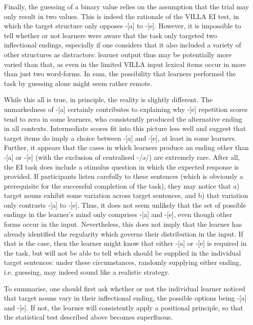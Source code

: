 Finally, the guessing of a binary value relies on the assumption that the trial may only result in two values. This is indeed the rationale of the VILLA EI test, in which the target structure only opposes -[a] to -[e]. However, it is impossible to tell whether or not learners were aware that the task only targeted two inflectional endings, especially if one considers that it also included a variety of other structures as distractors: learner output thus may be potentially more varied than that, as even in the limited VILLA input lexical items occur in more than just two word-forms. In sum, the possibility that learners performed the task by guessing alone might seem rather remote.

While this all is true, in principle, the reality is slightly different. The unmarkedness of -[a] certainly contributes to explaining why -[e] repetition scores tend to zero in some learners, who consistently produced the alternative ending in all contexts. Intermediate scores fit into this picture less well and suggest that target items do imply a choice between -[a] and -[e], at least in some learners. Further, it appears that the cases in which learners produce an ending other than -[a] or -[e] (with the exclusion of centralised -/ə/) are extremely rare. After all, the EI task does include a stimulus question in which the expected response is provided. If participants listen carefully to these sentences (which is obviously a prerequisite for the successful completion of the task), they may notice that a) target nouns exhibit some variation across target sentences, and b) that variation only contrasts -[a] to -[e]. Thus, it does not seem unlikely that the set of possible endings in the learner’s mind only comprises -[a] and -[e], even though other forms occur in the input. Nevertheless, this does not imply that the learner has already identified the regularity which governs their distribution in the input. If that is the case, then the learner might know that either -[a] or -[e] is required in the task, but will not be able to tell which should be supplied in the individual target sentences: under these circumstances, randomly supplying either ending, i.e. guessing, may indeed sound like a realistic strategy.

To summarise, one should first ask whether or not the individual learner noticed that target nouns vary in their inflectional ending, the possible options being -[a] and -[e]. If not, the learner will consistently apply a positional principle, so that the statistical test described above becomes superfluous.

